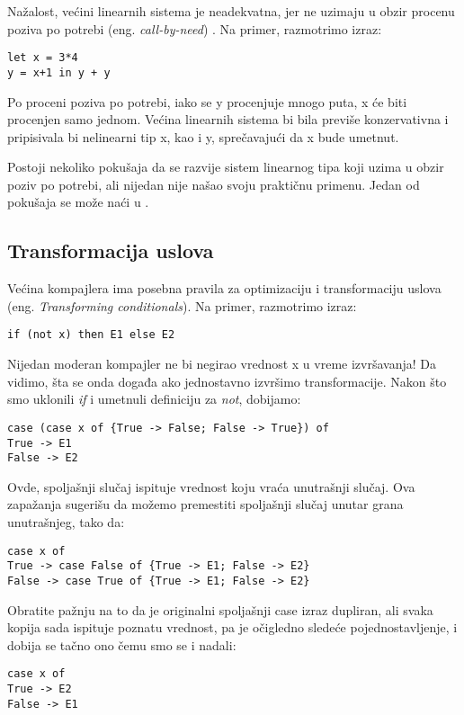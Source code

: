 Nažalost, većini linearnih sistema je neadekvatna, jer ne uzimaju u obzir procenu poziva po potrebi (eng. \emph{call-by-need}) \cite{turner}. Na primer, 
razmotrimo izraz:
\begin{verbatim}
let x = 3*4
y = x+1 in y + y
\end{verbatim}
Po proceni poziva po potrebi, iako se y procenjuje mnogo puta, x će biti procenjen samo jednom. Većina linearnih 
sistema bi bila previše konzervativna i pripisivala bi nelinearni tip x, kao i y, sprečavajući da x bude umetnut.

Postoji nekoliko pokušaja da se razvije sistem linearnog tipa koji uzima u obzir poziv po potrebi, ali nijedan nije našao svoju praktičnu primenu. Jedan od pokušaja se može naći u \cite{transformation-based-optimiser-Haskell}. 


\subsection {Transformacija uslova}
\label{sec:podnaslovTransformation}

Većina kompajlera ima posebna pravila za optimizaciju i transformaciju uslova (eng. \emph{Transforming conditionals}). Na primer, razmotrimo izraz:
\begin{verbatim}
if (not x) then E1 else E2
\end{verbatim}
Nijedan moderan kompajler ne bi negirao vrednost x u vreme izvršavanja! Da vidimo, šta se onda događa ako jednostavno 
izvršimo transformacije. Nakon što smo uklonili \textit{if} i umetnuli definiciju za \textit{not}, dobijamo:
\begin{verbatim}
case (case x of {True -> False; False -> True}) of
True -> E1
False -> E2
\end{verbatim}
Ovde, spoljašnji slučaj ispituje vrednost koju vraća unutrašnji slučaj. Ova zapažanja sugerišu da možemo premestiti spoljašnji slučaj 
unutar grana unutrašnjeg, tako da:
\begin{verbatim}
case x of
True -> case False of {True -> E1; False -> E2}
False -> case True of {True -> E1; False -> E2}
\end{verbatim}

Obratite pažnju na to da je originalni spoljašnji case izraz dupliran, ali svaka kopija sada ispituje poznatu vrednost, pa je 
očigledno sledeće pojednostavljenje, i dobija se tačno ono čemu smo se i nadali:
\begin{verbatim}
case x of
True -> E2
False -> E1
\end{verbatim}

